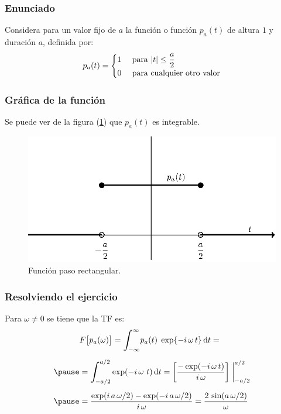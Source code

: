 \begin{frame}
\frametitle{Enunciado}
Considera para un valor fijo de $a$ la función  o función  $p_{a}(t)$ de altura $1$ y duración $a$, definida por:
\pause
\begin{align}
p_{a}(t) = \begin{cases}
1 & \text{ para } \abs{t} \leq \dfrac{a}{2} \\
0 & \text{ para cualquier otro valor} \end{cases}
\label{eq:ecuacion_06_10_Beerends}
\end{align}
\end{frame}
\begin{frame}
\frametitle{Gráfica de la función}
Se puede ver de la figura (\ref{fig:figura_funcionpaso}) que $p_{a}(t)$ es integrable.
\pause
\begin{figure}[H]
    \centering
    \includegraphics[scale=0.75]{Imagenes/funcion_paso.eps}
    \caption{Función paso rectangular.}
    \label{fig:figura_funcionpaso}
\end{figure}
\end{frame}
\begin{frame}
\frametitle{Resolviendo el ejercicio}
Para $\omega \neq 0$ se tiene que la TF es:
\pause
\begin{eqnarray*}
\begin{aligned}
&F \big[p_{a} (\omega)\big] = \scaleint{6ex}_{\bs -\infty}^{\infty} p_{a}(t) \; \exp{-i \, \omega \, t} \dd{t} = \\[0.5em] \pause
&= \scaleint{6ex}_{\bs -a/2}^{a/2} \exp(-i \, \omega \ t) \dd{t} = \left[ \dfrac{- \exp(- i \, \omega \, t)}{i \, \omega} \right] \eval_{-a/2}^{a/2} \\[0.5em] \pause
&= \dfrac{\exp(i \, a \, \omega/2) - \exp(-i \, a \, \omega/2)}{i \, \omega} = \dfrac{2 \, \sin (a \, \omega/2)}{\omega}
\end{aligned}
\end{eqnarray*}
\end{frame}
